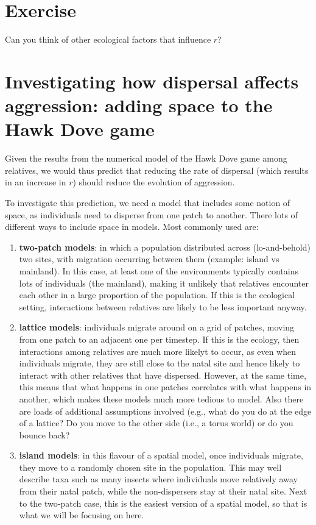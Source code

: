 \documentclass[
]{book}
\begin{document}
\hypertarget{exercise-11}{%
\section{Exercise}\label{exercise-11}}

Can you think of other ecological factors that influence \(r\)?

\hypertarget{investigating-how-dispersal-affects-aggression-adding-space-to-the-hawk-dove-game}{%
\section{Investigating how dispersal affects aggression: adding space to the Hawk Dove game}\label{investigating-how-dispersal-affects-aggression-adding-space-to-the-hawk-dove-game}}

Given the results from the numerical model of the Hawk Dove game among relatives, we would thus predict that reducing the rate of dispersal (which results in an increase in \(r\)) should reduce the evolution of aggression.

To investigate this prediction, we need a model that includes some notion of space, as individuals need to disperse from one patch to another. There lots of different ways to include space in models. Most commonly used are:

\begin{enumerate}
\def\labelenumi{\arabic{enumi}.}
\item
  \textbf{two-patch models}: in which a population distributed across (lo-and-behold) two sites, with migration occurring between them (example: island vs mainland). In this case, at least one of the environments typically contains lots of individuals (the mainland), making it unlikely that relatives encounter each other in a large proportion of the population. If this is the ecological setting, interactions between relatives are likely to be less important anyway.
\item
  \textbf{lattice models}: individuals migrate around on a grid of patches, moving from one patch to an adjacent one per timestep. If this is the ecology, then interactions among relatives are much more likelyt to occur, as even when individuals migrate, they are still close to the natal site and hence likely to interact with other relatives that have dispersed. However, at the same time, this means that what happens in one patches correlates with what happens in another, which makes these models much more tedious to model. Also there are loads of additional assumptions involved (e.g., what do you do at the edge of a lattice? Do you move to the other side (i.e., a torus world) or do you bounce back?
\item
  \textbf{island models}: in this flavour of a spatial model, once individuals migrate, they move to a randomly chosen site in the population. This may well describe taxa such as many insects where individuals move relatively away from their natal patch, while the non-dispersers stay at their natal site. Next to the two-patch case, this is the easiest version of a spatial model, so that is what we will be focusing on here.
\end{enumerate}
\end{document}
